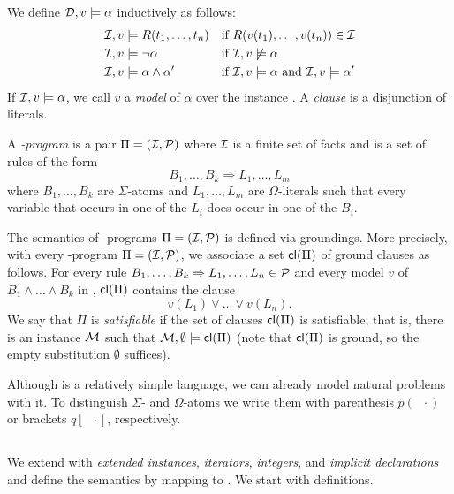\documentclass[conference]{IEEEtran}
\begin{document}
We define $\mathcal{D},v\models \alpha$ inductively as follows: 
%
\begin{align*}
  \mathcal{I},v & \models R(t_1,\ldots,t_n) && \text{if
  $R(v(t_1),\ldots,v(t_n))\in \mathcal{I}$} \\
  \mathcal{I}, v& \models \neg \alpha && \text{if $\mathcal{I},v\not\models \alpha$}
  \\
  \mathcal{I}, v& \models \alpha \wedge \alpha' && \text{if $\mathcal{I},v\models
  \alpha$ and $\mathcal{I},v\models\alpha'$}
\end{align*}
%
If $\mathcal{I},v\models\alpha$, we call $v$ a \emph{model} of $\alpha$ over the instance \Imc. 
A \emph{clause} is a disjunction of literals.

A \emph{\bcore-program} is a pair $\Pi=(\mathcal{I},\mathcal{P})$ where $\mathcal{I}$ is a finite set of facts and \Pmc is a set of rules of the form 
%
\[B_1, \ldots, B_k \Rightarrow L_1, \ldots, L_m\]
%
where $B_1,\ldots,B_k$ are $\Sigma$-atoms and $L_1,\ldots,L_m$ are $\Omega$-literals such that every variable that occurs in one of the $L_i$ does occur in one of the $B_i$.

The semantics of \bcore-programs $\Pi=(\mathcal{I},\mathcal{P})$ is defined via groundings. 
More precisely, with every \bcore-program $\Pi=(\mathcal{I},\mathcal{P})$, we associate a set $\mathsf{cl}(\Pi)$ of ground clauses as follows.  
For every rule $B_1,\ldots,B_k \Rightarrow L_1,\ldots, L_n\in\mathcal{P}$ and every model $v$ of $B_1\wedge\ldots\wedge B_k$ in \Imc, $\mathsf{cl}(\Pi)$ contains the clause
%
\[v(L_1)\vee\ldots\vee v(L_n).\]
%
We say that $\Pi$ is \emph{satisfiable} if the set of clauses $\mathsf{cl}(\Pi)$ is satisfiable, that is, 
there is an instance $\mathcal{M}$ such that $\mathcal{M},\emptyset \models\mathsf{cl}(\Pi)$ (note that $\mathsf{cl}(\Pi)$ is ground, so the empty substitution $\emptyset$ suffices).

{\color{red} Although \bcore is a relatively simple language, we can
already model natural problems with it. To distinguish $\Sigma$- and
$\Omega$-atoms we write them with parenthesis $p(\;\;\cdot)$ or brackets
$q[\;\;\cdot]$,
respectively.


\begin{example}
  
\end{example}

}


\subsection{\bfull}

We extend \bcore with \emph{extended instances}, \emph{iterators},
\emph{integers}, and \emph{implicit declarations} and define the
semantics by mapping to \bcore. We start with definitions. 
\end{document}
